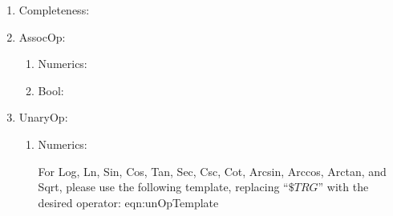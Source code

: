 
\begin{enumerate}

    \item Completeness:
        \newrule{}
            {}
        
        \newrule{}
            {}

    \item AssocOp:
        \begin{enumerate}
            \item Numerics:
                    {}
        
                    {}
    
            \item Bool:
                \newrule{}
                    {}
        
                \newrule{}
                    {}
        \end{enumerate}

    \item UnaryOp:
        \begin{enumerate}
            \item Numerics:
                    {}

                    {}
                
                    {}
                
                For Log, Ln, Sin, Cos, Tan, Sec, Csc, Cot, Arcsin, Arccos, Arctan, and Sqrt, please use the following template, replacing ``$\$TRG$'' with the desired operator:
                \newlblrule{}
                    {}{eqn:unOpTemplate}

                \newrule{}
                    {}
                
                \newrule{}
                    {}
            
                \newrule{}
                    {}


\end{enumerate}
\end{enumerate}
